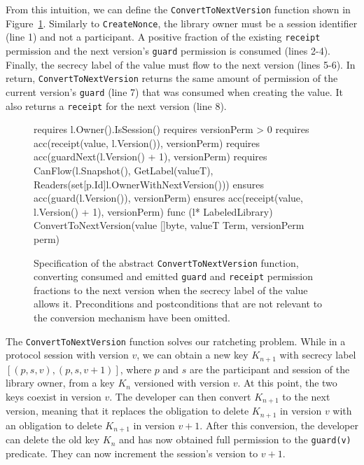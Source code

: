 From this intuition, we can define the \texttt{ConvertToNextVersion} function shown in Figure~\ref{lst:convert-to-next-version}.
Similarly to \texttt{CreateNonce}, the library owner must be a session identifier (line 1) and not a participant. A positive fraction of the existing \texttt{receipt} permission and the next version's \texttt{guard} permission is consumed (lines 2-4). Finally, the secrecy label of the value must flow to the next version (lines 5-6).
In return, \texttt{ConvertToNextVersion} returns the same amount of permission of the current version's \texttt{guard} (line 7) that was consumed when creating the value. It also returns a \texttt{receipt} for the next version (line 8).

\begin{figure}
    \begin{gobra}
requires l.Owner().IsSession()
requires versionPerm > 0
requires acc(receipt(value, l.Version()), versionPerm)
requires acc(guardNext(l.Version() + 1), versionPerm)
requires CanFlow(l.Snapshot(), GetLabel(valueT),
    Readers(set[p.Id]{l.OwnerWithNextVersion()}))
ensures  acc(guard(l.Version()), versionPerm)
ensures  acc(receipt(value, l.Version() + 1), versionPerm)
func (l* LabeledLibrary) ConvertToNextVersion(value []byte,
    valueT Term, versionPerm perm)
    \end{gobra}
    \caption{Specification of the abstract \texttt{ConvertToNextVersion} function, converting consumed and emitted \texttt{guard} and \texttt{receipt} permission fractions to the next version when the secrecy label of the value allows it. Preconditions and postconditions that are not relevant to the conversion mechanism have been omitted.}
    \label{lst:convert-to-next-version}
\end{figure}

The \texttt{ConvertToNextVersion} function solves our ratcheting problem. While in a protocol session with version $v$, we can obtain a new key $K_{n+1}$ with secrecy label $[(p,s,v), (p,s,v+1)]$, where $p$ and $s$ are the participant and session of the library owner, from a key $K_n$ versioned with version $v$. At this point, the two keys coexist in version $v$.
The developer can then convert $K_{n+1}$ to the next version, meaning that it replaces the obligation to delete $K_{n+1}$ in version $v$ with an obligation to delete $K_{n+1}$ in version $v+1$.
After this conversion, the developer can delete the old key $K_n$ and has now obtained full permission to the \texttt{guard(v)} predicate. They can now increment the session's version to $v+1$.

